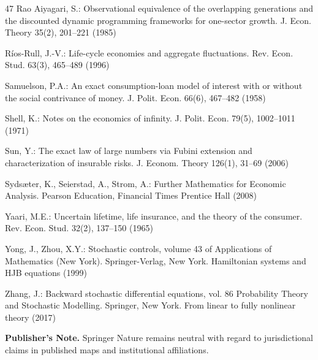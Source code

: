 \documentclass[11pt,oneside,english,reqno,dvipsnames,table]{amsart}
\numberwithin{equation}{section}
\theoremstyle{plain}
\theoremstyle{definition}
\theoremstyle{remark}
\theoremstyle{plain}
\theoremstyle{plain}
\theoremstyle{plain}
\theoremstyle{plain}
\theoremstyle{plain}
\theoremstyle{plain}
\theoremstyle{plain}
\numberwithin{thm}{section}
\begin{document}
\begin{thebibliography}{47}
Rao Aiyagari, S.: Observational equivalence of the overlapping generations and the discounted dynamic programming frameworks for one-sector growth. J. Econ. Theory 35(2), 201--221 (1985)

R\'ios-Rull, J.-V.: Life-cycle economies and aggregate fluctuations. Rev. Econ. Stud. 63(3), 465--489 (1996)

Samuelson, P.A.: An exact consumption-loan model of interest with or without the social contrivance of money. J. Polit. Econ. 66(6), 467--482 (1958)

Shell, K.: Notes on the economics of infinity. J. Polit. Econ. 79(5), 1002--1011 (1971)

Sun, Y.: The exact law of large numbers via Fubini extension and characterization of insurable risks. J. Econom. Theory 126(1), 31--69 (2006)

Syds\ae{}ter, K., Seierstad, A., Strom, A.: Further Mathematics for Economic Analysis. Pearson Education, Financial Times Prentice Hall (2008)

Yaari, M.E.: Uncertain lifetime, life insurance, and the theory of the consumer. Rev. Econ. Stud. 32(2), 137--150 (1965)

Yong, J., Zhou, X.Y.: Stochastic controls, volume 43 of Applications of Mathematics (New York). Springer-Verlag, New York. Hamiltonian systems and HJB equations (1999)

Zhang, J.: Backward stochastic differential equations, vol. 86 Probability Theory and Stochastic Modelling. Springer, New York. From linear to fully nonlinear theory (2017)

\end{thebibliography}

\noindent\textbf{Publisher's Note.} Springer Nature remains neutral with regard to jurisdictional claims in published maps and institutional affiliations.
\end{document}
